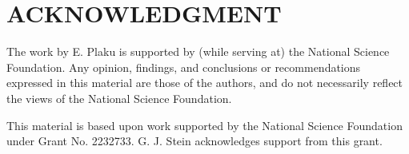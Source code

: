 \documentclass[letterpaper, 10 pt, conference]{ieeeconf}  %
\begin{document}






\section*{ACKNOWLEDGMENT}

The work by E. Plaku is supported by (while serving at) the National Science Foundation. 
Any opinion, findings, and conclusions or recommendations expressed in this material are 
those of the authors, and do not necessarily reflect the views of the National Science 
Foundation.

This material is based upon work supported by the National Science Foundation under Grant 
No. 2232733. G. J. Stein acknowledges support from this grant.

% 




\end{document}
